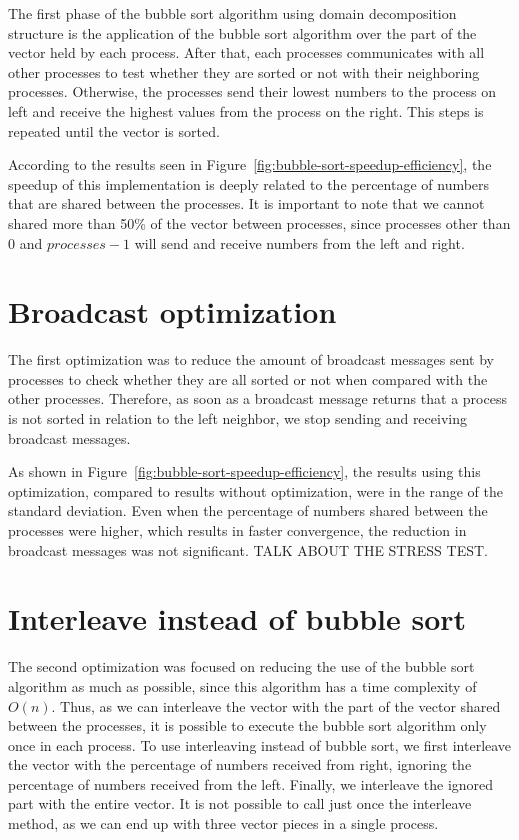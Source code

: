\documentclass[10pt,twocolumn]{article}
\begin{document}
The first phase of the bubble sort algorithm using domain decomposition structure is the application of the bubble sort algorithm over the part of the vector held by each process. After that, each processes communicates with all other processes to test whether they are sorted or not with their neighboring processes. Otherwise, the processes send their lowest numbers to the process on left and receive the highest values from the process on the right. This steps is repeated until the vector is sorted.

According to the results seen in Figure~\ref{fig:bubble-sort-speedup-efficiency}, the speedup of this implementation is deeply related to the percentage of numbers that are shared between the processes. It is important to note that we cannot shared more than 50\% of the vector between processes, since processes other than $0$ and $processes - 1$ will send and receive numbers from the left and right.


\section*{Broadcast optimization}

The first optimization was to reduce the amount of broadcast messages sent by processes to check whether they are all sorted or not when compared with the other processes. Therefore, as soon as a broadcast message returns that a process is not sorted in relation to the left neighbor, we stop sending and receiving broadcast messages.

As shown in Figure~\ref{fig:bubble-sort-speedup-efficiency}, the results using this optimization, compared to results without optimization, were in the range of the standard deviation. Even when the percentage of numbers shared between the processes were higher, which results in faster convergence, the reduction in broadcast messages was not significant. TALK ABOUT THE STRESS TEST.


\section*{Interleave instead of bubble sort}

The second optimization was focused on reducing the use of the bubble sort algorithm as much as possible, since this algorithm has a time complexity of $O(n)$. Thus, as we can interleave the vector with the part of the vector shared between the processes, it is possible to execute the bubble sort algorithm only once in each process. To use interleaving instead of bubble sort, we first interleave the vector with the percentage of numbers received from right, ignoring the percentage of numbers received from the left. Finally, we interleave the ignored part with the entire vector. It is not possible to call just once the interleave method, as we can end up with three vector pieces in a single process.
\end{document}
